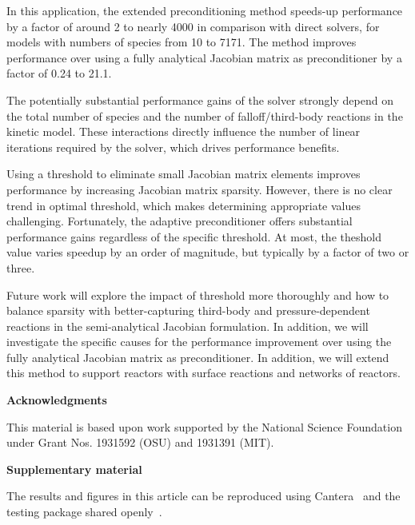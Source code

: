 \documentclass[twocolumn,10pt]{article}
\renewcommand{\section}%
              [1]%
              {%
               \bgroup%
               \flushleft%
               \small\bf%
               \stepcounter{section}%
               \arabic{section}. #1%
               \par%
               \egroup%
              }%
\newcommand{\acknowledgement}%
              [1]%
              {%
               \bgroup%
               \flushleft%
               \small\bf%
               #1%
               \par%
               \egroup%
              }%
\newcommand{\sectionOne}[1]{\section{#1} \addvspace{10pt}}
\begin{document}
In this application, the extended preconditioning method speeds-up performance by a factor of around 2 to nearly 4000 in comparison with direct solvers, for models with numbers of species from 10 to 7171.
The method improves performance over using a fully analytical Jacobian matrix as preconditioner by a factor of 0.24 to 21.1.

The potentially substantial performance gains of the solver strongly depend on the total number of species and the number of falloff\slash third-body reactions in the kinetic model.
These interactions directly influence the number of linear iterations required by the solver, which drives performance benefits.

Using a threshold to eliminate small Jacobian matrix elements improves performance by increasing Jacobian matrix sparsity.
However, there is no clear trend in optimal threshold, which makes determining appropriate values challenging.
Fortunately, the adaptive preconditioner offers substantial performance gains regardless of the specific threshold.
At most, the theshold value varies speedup by an order of magnitude, but typically by a factor of two or three.

Future work will explore the impact of threshold more thoroughly and how to balance sparsity with better-capturing third-body and pressure-dependent reactions in the semi-analytical Jacobian formulation.
In addition, we will investigate the specific causes for the performance improvement over using the fully analytical Jacobian matrix as preconditioner.
In addition, we will extend this method to support reactors with surface reactions and networks of reactors.


\acknowledgement{Acknowledgments} \addvspace{10pt}

This material is based upon work supported by the National Science Foundation under Grant Nos. 1931592 (OSU) and 1931391 (MIT).


\acknowledgement{Supplementary material} \addvspace{10pt}

The results and figures in this article can be reproduced using Cantera~\cite{cantera} and the testing package shared openly~\cite{testing_package}.
\end{document}
